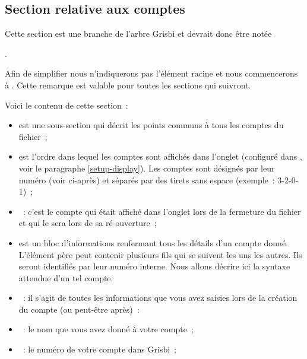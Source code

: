\subsection{Section relative aux comptes}

Cette section est une branche de l'arbre Grisbi et devrait donc
être notée

 .

Afin de simplifier nous n'indiquerons pas l'élément racine 
et nous commencerons à . Cette remarque est valable pour toutes 
les sections qui suivront.

Voici le contenu de cette section~:

\begin{itemize}

\item {} est une sous-section qui décrit les points 
communs à tous les comptes du fichier~;

\item {} est l'ordre dans
lequel les comptes sont affichés dans l'onglet  (configuré dans 
, voir le paragraphe \vref{setup-display}).
Les comptes sont désignés par leur numéro (voir ci-après) et séparés par des
tirets sans espace (exemple~: 3-2-0-1)~;

\item {}~: c'est le compte qui 
était affiché dans l'onglet  lors de la fermeture du fichier et 
qui le sera lors de sa ré-ouverture~;

\item {} est un bloc d'informations renfermant tous les 
détails d'un compte donné. L'élément père  peut contenir 
plusieurs fils  qui se suivent les uns les autres. Ils seront 
identifiés par leur numéro interne. Nous allons décrire ici la syntaxe attendue 
d'un tel compte.

\item {} ~: il s'agit de toutes les informations 
que vous avez saisies lors de la création du compte (ou peut-être après)~:

\item {}~: le nom que vous avez donné à 
votre compte~;

\item {}~: le numéro de votre 
compte dans Grisbi~;


\end{itemize}
